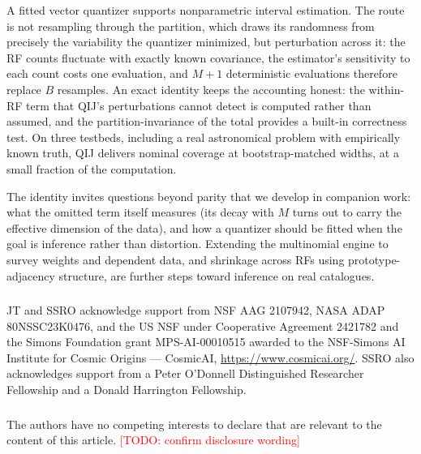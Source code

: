 \documentclass[runningheads]{llncs}
\newcommand{\todo}[1]{\textcolor{red}{[TODO: #1]}}
\begin{document}
A fitted vector quantizer supports nonparametric interval estimation. The route is not resampling through the partition, which draws its randomness from precisely the variability the quantizer minimized, but perturbation across it: the RF counts fluctuate with exactly known covariance, the estimator's sensitivity to each count costs one evaluation, and $M{+}1$ deterministic evaluations therefore replace $B$ resamples. An exact identity keeps the accounting honest: the within-RF term that QIJ's perturbations cannot detect is computed rather than assumed, and the partition-invariance of the total provides a built-in correctness test. On three testbeds, including a real astronomical problem with empirically known truth, QIJ delivers nominal coverage at bootstrap-matched widths, at a small fraction of the computation.

The identity invites questions beyond parity that we develop in companion work: what the omitted term itself measures (its decay with $M$ turns out to carry the effective dimension of the data), and how a quantizer should be fitted when the goal is inference rather than distortion. Extending the multinomial engine to survey weights and dependent data, and shrinkage across RFs using prototype-adjacency structure, are further steps toward inference on real catalogues.

\begin{credits}
\subsubsection{\ackname} JT and SSRO acknowledge support from NSF AAG 2107942, NASA ADAP 80NSSC23K0476, and the US NSF under Cooperative Agreement 2421782 and the Simons Foundation grant MPS-AI-00010515 awarded to the NSF-Simons AI Institute for Cosmic Origins --- CosmicAI, \url{https://www.cosmicai.org/}. SSRO also acknowledges support from a Peter O'Donnell Distinguished Researcher Fellowship and a Donald Harrington Fellowship.
\subsubsection{\discintname} The authors have no competing interests to declare that are relevant to the content of this article. \todo{confirm disclosure wording}
\end{credits}



\end{document}
